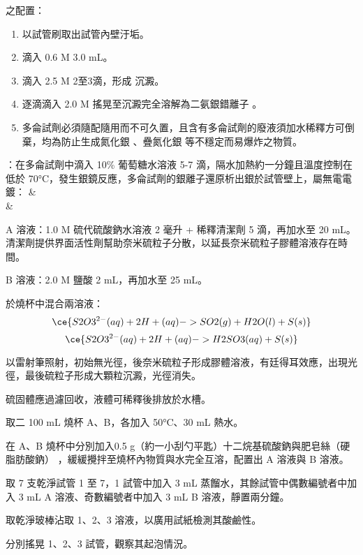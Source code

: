 \documentclass[a4paper,12pt]{article}
\begin{document}
\eit
\een
{}
之配置：
\begin{enumerate}
\item 以試管刷取出試管內壁汙垢。
\item 滴入 0.6 M  3.0 mL。
\item 滴入 2.5 M  2至3滴，形成 沉澱。
\item 逐滴滴入 2.0 M  搖晃至沉澱完全溶解為二氨銀錯離子 \ce{[Ag(NH3)2]+}。
\item 多侖試劑必須隨配隨用而不可久置，且含有多侖試劑的廢液須加水稀釋方可倒棄，均為防止生成氮化銀  、疊氮化銀  等不穩定而易爆炸之物質。
\end{enumerate}

：在多侖試劑中滴入 10\% 葡萄糖水溶液 5-7 滴，隔水加熱約一分鐘且溫度控制在低於 70°C，發生銀鏡反應，多侖試劑的銀離子還原析出銀於試管壁上，屬無電電鍍：
\bma
& \\
\tx{\ce{->}} & 
\eam
{}
\ben
\item A 溶液：1.0 M 硫代硫酸鈉水溶液 2 毫升 + 稀釋清潔劑 5 滴，再加水至 20 mL。清潔劑提供界面活性劑幫助奈米硫粒子分散，以延長奈米硫粒子膠體溶液存在時間。
\item B 溶液：2.0 M 鹽酸 2 mL，再加水至 25 mL。
\item 於燒杯中混合兩溶液：
\[\ce{S2O3^{2-}(aq) + 2H+(aq) -> SO2(g) + H2O(l) + S(s)}\]
\[\ce{S2O3^{2-}(aq) + 2H+(aq) -> H2SO3(aq) + S(s)}\]
\item 以雷射筆照射，初始無光徑，後奈米硫粒子形成膠體溶液，有廷得耳效應，出現光徑，最後硫粒子形成大顆粒沉澱，光徑消失。
\item 硫固體應過濾回收，液體可稀釋後排放於水槽。
\een
{}
\ben
\item 取二 100 mL 燒杯 A、B，各加入 50°C、30 mL 熱水。
\item 在 A、B 燒杯中分別加入0.5 g（約一小刮勺平匙）十二烷基硫酸鈉與肥皂絲（硬脂肪酸鈉） ，緩緩攪拌至燒杯內物質與水完全互溶，配置出 A 溶液與 B 溶液。
\item 取 7 支乾淨試管 1 至 7，1 試管中加入 3 mL 蒸餾水，其餘試管中偶數編號者中加入 3 mL A 溶液、奇數編號者中加入 3 mL B 溶液，靜置兩分鐘。
\item 取乾淨玻棒沾取 1、2、3 溶液，以廣用試紙檢測其酸鹼性。
\item 分別搖晃 1、2、3 試管，觀察其起泡情況。
\end{document}

